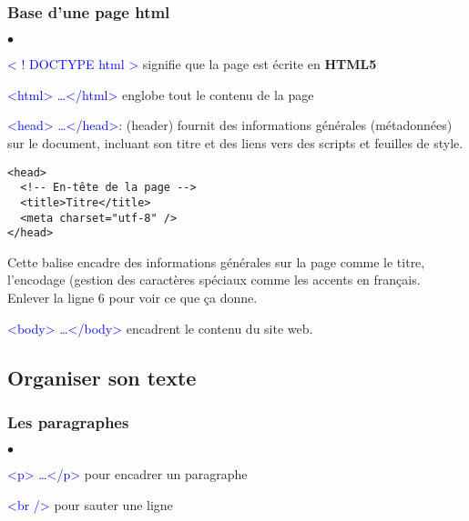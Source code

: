 \documentclass[10pt,dvipsnames, dvips, svgnames]{article}
\begin{document}
\subsubsection{Base d'une page html}
\begin{list}{$\bullet$}{}
\item   \textcolor{Blue}{< ! DOCTYPE html >} signifie que la page est écrite en \textbf{HTML5}
\item   \textcolor{Blue}{<html> \dots </html>} englobe tout le contenu de la page
\item   \textcolor{Blue}{<head> \dots </head>}: (header) fournit des informations générales (métadonnées) sur le document, incluant son titre et des liens vers des scripts et feuilles de style. \\
\begin{lstlisting}
<head>
  <!-- En-tête de la page -->
  <title>Titre</title>
  <meta charset="utf-8" />
</head>
\end{lstlisting}
	Cette balise encadre des informations générales sur la page comme le titre, l'encodage (gestion des caractères spéciaux comme les accents en français.\\
Enlever la ligne 6 pour voir ce que ça donne.
\item   \textcolor{Blue}{<body> \dots </body>} encadrent le contenu du site web.
\end{list}

\subsection{ Organiser son texte}
\subsubsection{Les paragraphes}

\begin{list}{$\bullet$}{}
\item \textcolor{Blue}{<p> \dots </p>} pour encadrer un paragraphe
\item \textcolor{Blue}{<br />} pour sauter une ligne
\end{list}
\end{document}
